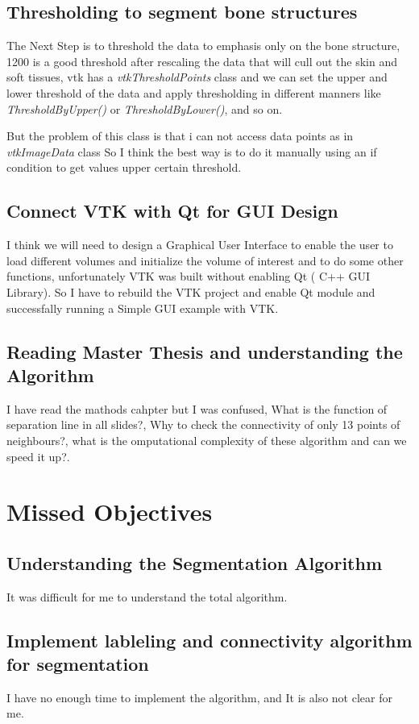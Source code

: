 \documentclass[10pt, b5paper]{article}
\begin{document}
\subsection{Thresholding to segment bone structures}
The Next Step is to threshold the data to emphasis only on the bone structure, 1200 is a good threshold after rescaling the data that will cull out the skin and soft tissues, vtk has a \textit{vtkThresholdPoints} class and we can
set the upper and lower threshold of the data and apply thresholding in different manners like \textit{ThresholdByUpper()} 
or \textit{ThresholdByLower()}, and so on.

But the problem of this class is that i can not access data points as in \textit{vtkImageData} class So I think the best way 
is to do it manually using an if condition to get values upper certain threshold.

\subsection{Connect VTK with Qt for GUI Design}
I think we will need to design a Graphical User Interface to enable the user to load different volumes and initialize the volume of interest  and to do some other functions, unfortunately VTK was built without enabling Qt ( C++ GUI Library). So I have to rebuild the VTK project and enable Qt module and successfally running a Simple GUI example with VTK. 

\subsection{Reading Master Thesis and understanding the Algorithm}
I have read the mathods cahpter but I was confused, What is the function of separation line in all slides?, Why to check the connectivity of only 13 points of neighbours?, what is the omputational complexity of these algorithm and can we speed it up?. 
\section{Missed Objectives}
\subsection{Understanding the Segmentation Algorithm}
It was difficult for me to understand the total algorithm.
\subsection{Implement lableling and connectivity algorithm for segmentation}
I have no enough time to implement the algorithm, and It is also not clear for me.
\end{document}
